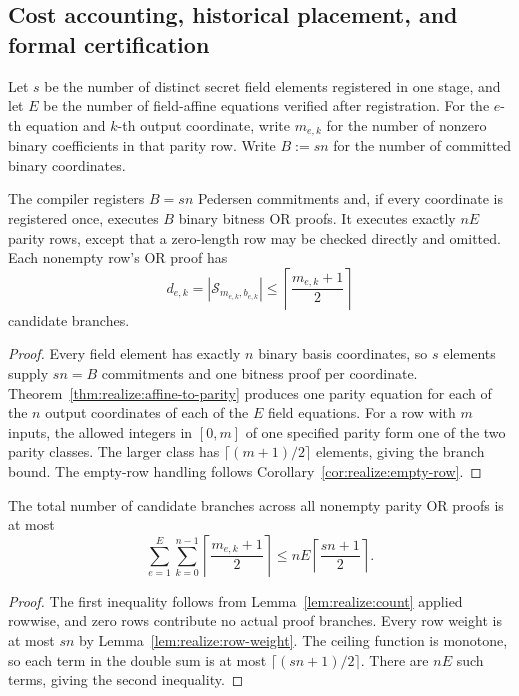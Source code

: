 \subsection{Cost accounting, historical placement, and formal certification}\label{sec:realize:cost}

\begin{definition}\label{def:realize:complexity}
Let $s$ be the number of distinct secret field
elements registered in one stage, and let
$E$ be the number of field-affine equations
verified after registration.
For the $e$-th equation and $k$-th
output coordinate, write $m_{e,k}$
for the number of nonzero binary
coefficients in that parity row.
Write $B:=sn$ for the number
of committed binary coordinates.
\end{definition}

\begin{lemma}\label{lem:realize:count}
The compiler registers $B=sn$ Pedersen
commitments and, if every coordinate is
registered once, executes $B$ binary
bitness OR proofs.
It executes exactly $nE$ parity rows,
except that a zero-length row may be
checked directly and omitted.
Each nonempty row's OR proof has
\[
 d_{e,k}=|\mathcal S_{m_{e,k},b_{e,k}}|
 \leq\left\lceil\frac{m_{e,k}+1}{2}\right\rceil
\]
candidate branches.
\end{lemma}
\begin{proof}
Every field element has exactly
$n$ binary basis coordinates,
so $s$ elements supply $sn=B$
commitments and one bitness
proof per coordinate.
Theorem~\ref{thm:realize:affine-to-parity}
produces one parity equation for
each of the $n$ output coordinates
of each of the $E$ field equations.
For a row with $m$ inputs,
the allowed integers in $[0,m]$
of one specified parity form
one of the two parity classes.
The larger class has
$\lceil(m+1)/2\rceil$ elements,
giving the branch bound.
The empty-row handling follows
Corollary~\ref{cor:realize:empty-row}.
\end{proof}

\begin{lemma}\label{lem:realize:branch-upper}
The total number of candidate
branches across all nonempty
parity OR proofs is at most
\[
 \boxed{
 \sum_{e=1}^{E}\sum_{k=0}^{n-1}
 \left\lceil\frac{m_{e,k}+1}{2}\right\rceil
 \leq nE\left\lceil\frac{sn+1}{2}\right\rceil.}
\]
\end{lemma}
\begin{proof}
The first inequality follows
from Lemma~\ref{lem:realize:count}
applied rowwise, and zero rows
contribute no actual proof branches.
Every row weight is at most
$sn$ by Lemma~\ref{lem:realize:row-weight}.
The ceiling function is monotone,
so each term in the double sum
is at most $\lceil(sn+1)/2\rceil$.
There are $nE$ such terms,
giving the second inequality.
\end{proof}

